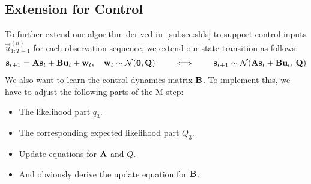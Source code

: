 	\subsection{Extension for Control}
		To further extend our algorithm derived in~\autoref{subsec:slds} to support control inputs \( \vec{u}_{1:T - 1}^{(n)} \) for each observation sequence, we extend our state transition as follows:
		\begin{align*}
			\boldsymbol{\mathrm{s}}_{t + 1} = \boldsymbol{\mathrm{A}} \boldsymbol{\mathrm{s}}_t + \boldsymbol{\mathrm{B}} \boldsymbol{\mathrm{u}}_t + \boldsymbol{\mathrm{w}}_t,\quad \boldsymbol{\mathrm{w}}_t \sim \mathcal{N}(\boldsymbol{\mathrm{0}}, \boldsymbol{\mathrm{Q}})
			\qquad\iff\qquad
			\boldsymbol{\mathrm{s}}_{t + 1} \sim \mathcal{N}(\boldsymbol{\mathrm{A}} \boldsymbol{\mathrm{s}}_t + \boldsymbol{\mathrm{B}} \boldsymbol{\mathrm{u}}_t,\, \boldsymbol{\mathrm{Q}})
		\end{align*}
		We also want to learn the control dynamics matrix \(\boldsymbol{\mathrm{B}}\). To implement this, we have to adjust the following parts of the M-step:
		\begin{itemize}
			\item The likelihood part \(q_3\).
			\item The corresponding expected likelihood part \(Q_3\).
			\item Update equations for \(\boldsymbol{\mathrm{A}}\) and \(Q\).
			\item And obviously derive the update equation for \(\boldsymbol{\mathrm{B}}\).
		\end{itemize}

